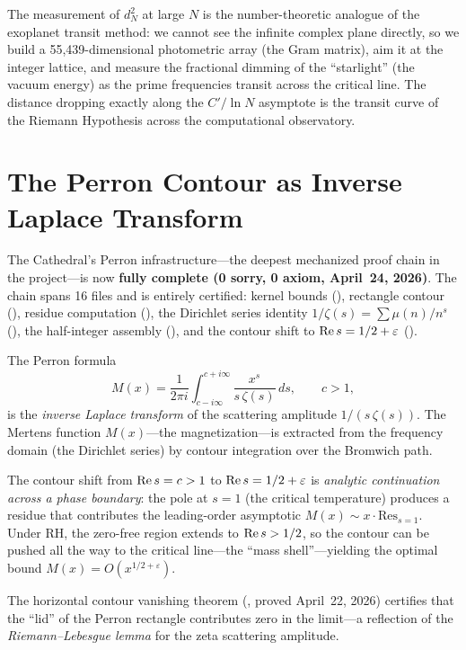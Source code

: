 \documentclass[11pt,a4paper]{article}
\begin{document}
\begin{correspondence}
The measurement of $d^2_N$ at large $N$ is the number-theoretic
analogue of the exoplanet transit method: we cannot see the infinite
complex plane directly, so we build a 55,439-dimensional photometric
array (the Gram matrix), aim it at the integer lattice, and measure
the fractional dimming of the ``starlight'' (the vacuum energy) as
the prime frequencies transit across the critical line. The distance
dropping exactly along the $C'/\ln N$ asymptote is the transit curve
of the Riemann Hypothesis across the computational observatory.
\end{correspondence}

\section{The Perron Contour as Inverse Laplace Transform}
\label{sec:perron}

The Cathedral's Perron infrastructure---the deepest mechanized proof chain
in the project---is now \textbf{fully complete (0 sorry, 0 axiom, April~24, 2026)}.
The chain spans 16 files and is entirely certified:
kernel bounds (), rectangle contour
(), residue computation
(), the Dirichlet series identity
$1/\zeta(s) = \sum \mu(n)/n^s$ (),
the half-integer assembly (), and the
contour shift to $\operatorname{Re} s = 1/2 + \varepsilon$ ().

\begin{principle}
The Perron formula
\[
  M(x) = \frac{1}{2\pi i}
  \int_{c - i\infty}^{c + i\infty}
  \frac{x^s}{s\,\zeta(s)}\,ds,
  \qquad c > 1,
\]
is the \emph{inverse Laplace transform} of the scattering amplitude
$1/(s\,\zeta(s))$. The Mertens function $M(x)$---the magnetization---is
extracted from the frequency domain (the Dirichlet series) by contour
integration over the Bromwich path.

The contour shift from $\operatorname{Re} s = c > 1$ to $\operatorname{Re} s = 1/2 + \varepsilon$
is \emph{analytic continuation across a phase boundary}: the pole at $s = 1$
(the critical temperature) produces a residue that contributes the
leading-order asymptotic $M(x) \sim x \cdot \mathrm{Res}_{s=1}$. Under RH,
the zero-free region extends to $\operatorname{Re} s > 1/2$, so the contour can be
pushed all the way to the critical line---the ``mass shell''---yielding
the optimal bound $M(x) = O(x^{1/2+\varepsilon})$.

The horizontal contour vanishing theorem (,
proved April~22, 2026) certifies that the ``lid'' of the Perron rectangle
contributes zero in the limit---a reflection of the \emph{Riemann--Lebesgue
lemma} for the zeta scattering amplitude.
\end{principle}
\end{document}
